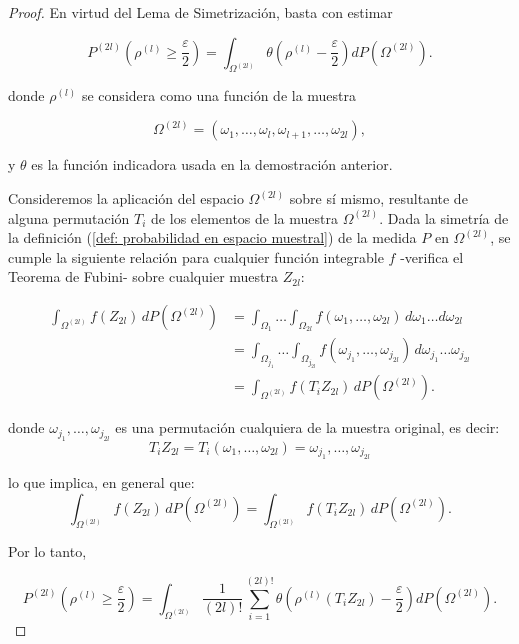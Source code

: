 \documentclass{report}
\begin{document}
\begin{proof}

En virtud del Lema de Simetrización, basta con estimar

\[
P^{(2l)}\left( \rho^{(l)} \geq \frac{\varepsilon}{2} \right) = \int_{\Omega^{(2l)}} \theta \left( \rho^{(l)} - \frac{\varepsilon}{2} \right) dP(\Omega^{(2l)}).
\]

donde \( \rho^{(l)} \) se considera como una función de la muestra

\[
\Omega^{(2l)} = (\omega_1, \dots, \omega_l, \omega_{l+1}, \dots, \omega_{2l}),
\]

y $\theta$ es la función indicadora usada en la demostración anterior.

Consideremos la aplicación del espacio \( \Omega^{(2l)} \) sobre sí mismo, resultante de alguna permutación \( T_i \) de los elementos de la muestra \( \Omega^{(2l)} \). Dada la simetría
de la definición (\ref{def: probabilidad en espacio muestral}) de la medida \( P \) en \( \Omega^{(2l)} \), se cumple la siguiente relación para cualquier función integrable \( f \)
-verifica el Teorema de Fubini- sobre cualquier muestra $Z_{2l}$:

\begin{equation*}
    \begin{split}
            \int_{\Omega^{(2l)}} f(Z_{2l}) \, dP(\Omega^{(2l)}) &= \int_{\Omega_1} \ldots \int_{\Omega_{2l}} f(\omega_1,\ldots,\omega_{2l})  \, d\omega_1\ldots d\omega_{2l} \\
                &= \int_{\Omega_{j_1}}\ldots\int_{\Omega_{j_{2l}}} f(\omega_{j_1},\ldots,\omega_{j_{2l}}) \, d\omega_{j_1}\ldots \omega_{j_{2l}}\\
                &= \int_{\Omega^{(2l)}} f(T_i Z_{2l}) \, dP(\Omega^{(2l)}).
    \end{split}
\end{equation*}

donde $\omega_{j_1},\ldots,\omega_{j_{2l}}$ es una permutación cualquiera de la muestra original, es decir:
\[
T_i Z_{2l} = T_i (\omega_1,\ldots,\omega_{2l}) = \omega_{j_1},\ldots,\omega_{j_{2l}}
\]

lo que implica, en general que:
\[
\int_{\Omega^{(2l)}} f(Z_{2l}) \, dP(\Omega^{(2l)}) = \int_{\Omega^{(2l)}} f(T_i Z_{2l}) \, dP(\Omega^{(2l)}).
\]

Por lo tanto,

\begin{equation}\label{eq:probabilidad integral con permutaciones}
P^{(2l)}\left( \rho^{(l)} \geq \frac{\varepsilon}{2} \right) = \int_{\Omega^{(2l)}} \frac{1}{(2l)!} \sum_{i=1}^{(2l)!} \theta \left( \rho^{(l)}(T_i Z_{2l}) - \frac{\varepsilon}{2}  \right) dP(\Omega^{(2l)}).
\end{equation}


\end{proof}
\end{document}
